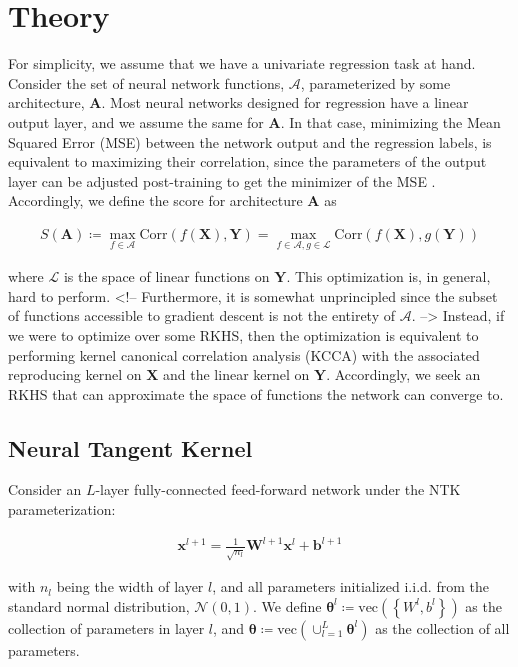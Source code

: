 \documentclass[a4paper,12pt]{article}
\begin{document}
\section{Theory}

For simplicity, we assume that we have a univariate regression task at hand. Consider the set of neural network functions, $\mathcal{A}$, parameterized by some architecture, $\mathbf{A}$. Most neural networks designed for regression have a linear output layer, and we assume the same for $\mathbf{A}$. In that case, minimizing the Mean Squared Error (MSE) between the network output and the regression labels, is equivalent to maximizing their correlation, since the parameters of the output layer can be adjusted post-training to get the minimizer of the MSE \cite{englisch_1994_corr-mse}. Accordingly, we define the score for architecture $\mathbf{A}$ as

\begin{align}
  S\left(\mathbf{A}\right)
  \coloneqq \max_{f\in\mathcal{A}} \text{Corr}\left(f\left(\mathbf{X}\right), \mathbf{Y}\right)
  = \max_{f\in\mathcal{A}, g\in\mathcal{L}} \text{Corr}\left(f\left(\mathbf{X}\right), g\left(\mathbf{Y}\right)\right)
\end{align}

where $\mathcal{L}$ is the space of linear functions on $\mathbf{Y}$. This optimization is, in general, hard to perform. <!-- Furthermore, it is somewhat unprincipled since the subset of functions accessible to gradient descent is not the entirety of $\mathcal{A}$. -->
Instead, if we were to optimize over some RKHS, then the optimization is equivalent to performing kernel canonical correlation analysis (KCCA) with the associated reproducing kernel on $\mathbf{X}$ and the linear kernel on $\mathbf{Y}$. Accordingly, we seek an RKHS that can approximate the space of functions the network can converge to.

\subsection{Neural Tangent Kernel}

Consider an $L$-layer fully-connected feed-forward network under the NTK parameterization:

\begin{align}
  \mathbf{x}^{l+1} = \frac{1}{\sqrt{n_l}} \mathbf{W}^{l+1}\mathbf{x}^l + \mathbf{b}^{l+1}
\end{align}

with $n_l$ being the width of layer $l$, and all parameters initialized i.i.d. from the standard normal distribution, $\mathcal{N}\left(0, 1\right)$. We define $\mathbf{\theta}^l \coloneqq \text{vec}\left(\left\{W^l,b^l\right\}\right)$ as the collection of parameters in layer $l$, and $\mathbf{\theta} \coloneqq \text{vec}\left(\cup_{l=1}^L \mathbf{\theta}^l \right)$ as the collection of all parameters.
\end{document}
